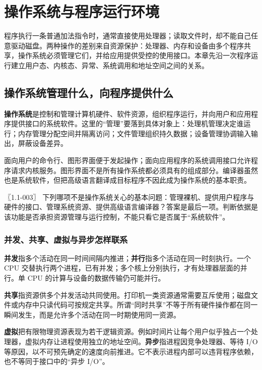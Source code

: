 \chapter{操作系统与程序运行环境}\label{os-ch1}

程序执行一条普通加法指令时，通常直接使用处理器；读取文件时，却不能自己任意驱动磁盘。两种操作的差别来自资源保护：处理器、内存和设备由多个程序共享，操作系统必须管理它们，并给应用提供受控的使用接口。本章先沿一次程序运行建立用户态、内核态、异常、系统调用和地址空间之间的关系。

\section{操作系统管理什么，向程序提供什么}\label{os-1-1}

\textbf{操作系统}是控制和管理计算机硬件、软件资源，组织程序运行，并向用户和应用程序提供接口的系统软件。这里的``管理''要落到具体对象上：处理机管理决定谁运行；内存管理分配空间并隔离访问；文件管理组织持久数据；设备管理协调输入输出，屏蔽设备差异。

面向用户的命令行、图形界面便于发起操作；面向应用程序的系统调用接口允许程序请求内核服务。图形界面不是所有操作系统都必须具有的组成部分。编译器虽然也是系统软件，但把高级语言翻译成目标程序不因此成为操作系统的基本职责。

\noindent{}〖1.1-003〗 下列哪项不是操作系统关心的基本问题：管理裸机、提供用户程序与硬件的接口、管理系统资源、提供高级语言编译器？答案是最后一项。判断依据是该功能是否承担资源管理与运行控制，不能只看它是否属于``系统软件''。

\subsection{并发、共享、虚拟与异步怎样联系}\label{os-c01-h13}

\textbf{并发}指多个活动在同一时间间隔内推进；\textbf{并行}指多个活动在同一时刻执行。一个 CPU 交替执行两个进程，已有并发；多个核上分别执行，才有处理器层面的并行。单 CPU 的计算与设备的数据传输仍可能并行。

\textbf{共享}指资源供多个并发活动共同使用。打印机一类资源通常需要互斥使用；磁盘文件或内存中只读代码可按规定共享。所谓``同时共享''不等于所有硬件操作都在同一瞬间发生，而是允许多个活动在同一时期使用同一资源。

\textbf{虚拟}把有限物理资源表现为若干逻辑资源。例如时间片让每个用户似乎独占一个处理器，虚拟内存让进程使用独立的地址空间。\textbf{异步}指进程因竞争处理器、等待 I/O 等原因，以不可预先确定的速度向前推进。它不表示进程内部可以违背程序依赖，也不等同于接口中的``异步 I/O''。


